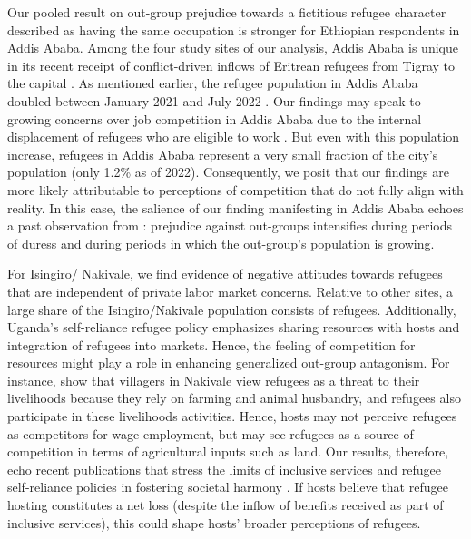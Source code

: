 \documentclass[a4paper,12pt]{article}
\begin{document}
Our pooled result on out-group prejudice towards a fictitious refugee character described as having the same occupation is stronger for Ethiopian respondents in Addis Ababa. Among the four study sites of our analysis, Addis Ababa is unique in its recent receipt of conflict-driven inflows of Eritrean refugees from Tigray to the capital \citep{tsegay2023internal}. As mentioned earlier, the refugee population in Addis Ababa doubled between January 2021 and July 2022 \citep{ethiopiaStatsNov22}. Our findings may speak to growing concerns over job competition in Addis Ababa due to the internal displacement of refugees who are eligible to work \citep{miller2021}. But even with this population increase, refugees in Addis Ababa represent a very small fraction of the city's population (only 1.2\% as of 2022). Consequently, we posit that our findings are more likely attributable to perceptions of competition that do not fully align with reality. In this case, the salience of our finding manifesting in Addis Ababa echoes a past observation from \cite{allport1954nature}: prejudice against out-groups intensifies during periods of duress and during periods in which the out-group's population is growing. 

For Isingiro/ Nakivale, we find evidence of negative attitudes towards refugees that are independent of private labor market concerns. Relative to other sites, a large share of the Isingiro/Nakivale population consists of refugees. Additionally, Uganda's self-reliance refugee policy emphasizes sharing resources with hosts and integration of refugees into markets. Hence, the feeling of competition for resources might play a role in enhancing generalized out-group antagonism. For instance, \citet{betts2023refugees} show that villagers in Nakivale view refugees as a threat to their livelihoods because they rely on farming and animal husbandry, and refugees also participate in these livelihoods activities. Hence, hosts may not perceive refugees as competitors for wage employment, but may see refugees as a source of competition in terms of agricultural inputs such as land.  Our results, therefore, echo recent publications that stress the limits of inclusive services and refugee self-reliance policies in fostering societal harmony \citep{omata2022rethinking}. If hosts believe that refugee hosting constitutes a net loss (despite the inflow of benefits received as part of inclusive services), this could shape hosts' broader perceptions of refugees.
\end{document}
